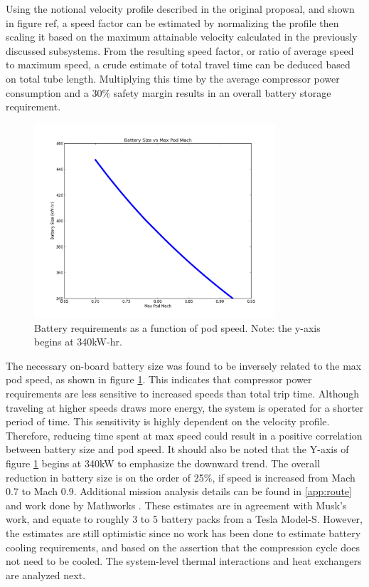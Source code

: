 \documentclass[heading.tex]{subfiles}
\begin{document}
Using the notional velocity profile described in the original proposal, and shown in figure {ref},
a speed factor can be estimated by normalizing the profile then scaling it based on the maximum
attainable velocity calculated in the previously discussed subsystems.
From the resulting speed factor, or ratio of average speed to maximum speed,
a crude estimate of total travel time can be deduced based on total tube length.
Multiplying this time by the average compressor power consumption and a 30\% safety margin results in an overall battery storage requirement.

\begin{figure}[hbtp]
\centering
\includegraphics[width=0.8\textwidth]{images/mach_vs_energy.png}
\caption[Battery requirements as a function of pod speed]{Battery requirements as a function of pod speed. Note: the y-axis begins at 340kW-hr.}
\label{f:battery}
\end{figure}

The necessary on-board battery size was found to be inversely related to the max pod speed, as shown in figure \ref{f:battery}.
This indicates that compressor power requirements are less sensitive to increased speeds than total trip time.
Although traveling at higher speeds draws more energy, the system is operated for a shorter period of time.
This sensitivity is highly dependent on the velocity profile.
Therefore, reducing time spent at max speed could result in a positive correlation between battery size and pod speed.
It should also be noted that the Y-axis of figure \ref{f:battery} begins at 340kW to emphasize the downward trend.
The overall reduction in battery size is on the order of 25\%, if speed is increased from Mach 0.7 to Mach 0.9.
Additional mission analysis details can be found in \cref{app:route} and work done by Mathworks \cite{Rouleau}.
These estimates are in agreement with Musk’s work, and equate to roughly 3 to 5 battery packs from a Tesla Model-S.
However, the estimates are still optimistic since no work has been done to estimate battery cooling requirements,
and based on the assertion that the compression cycle does not need to be cooled.
The system-level thermal interactions and heat exchangers are analyzed next.
\end{document}

